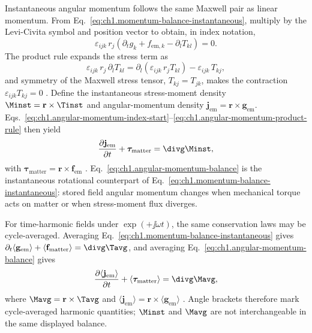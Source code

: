 Instantaneous angular momentum follows the same Maxwell pair as linear momentum. From Eq.~\eqref{eq:ch1.momentum-balance-instantaneous}, multiply by the Levi-Civita symbol and position vector to obtain, in index notation,
\begin{equation}
\label{eq:ch1.angular-momentum-index-start}
\varepsilon_{ijk}\,r_j\!\left(\partial_t g_k+f_{\mathrm{em},k}-\partial_l T_{kl}\right)
=0.
\end{equation}
The product rule expands the stress term as
\begin{equation}
\label{eq:ch1.angular-momentum-product-rule}
\varepsilon_{ijk}\,r_j\,\partial_l T_{kl}
=\partial_l\!\left(\varepsilon_{ijk}\,r_j T_{kl}\right)
-\varepsilon_{ijk}\,T_{kj},
\end{equation}
and symmetry of the Maxwell stress tensor, $T_{kj}=T_{jk}$, makes the contraction
$\varepsilon_{ijk}T_{kj}=0$ \cite{maxwell1873,stratton1941}. Define the instantaneous
stress-moment density $\Minst=\mathbf{r}\times\Tinst$ and angular-momentum density
$\mathbf{j}_{\mathrm{em}}=\mathbf{r}\times\mathbf{g}_{\mathrm{em}}$. Eqs.~\eqref{eq:ch1.angular-momentum-index-start}--\eqref{eq:ch1.angular-momentum-product-rule} then yield
\begin{equation}
\label{eq:ch1.angular-momentum-balance}
\frac{\partial\mathbf{j}_{\mathrm{em}}}{\partial t}+\boldsymbol{\tau}_{\mathrm{matter}}
=\divg\Minst,
\end{equation}
with $\boldsymbol{\tau}_{\mathrm{matter}}=\mathbf{r}\times\mathbf{f}_{\mathrm{em}}$ \cite{maxwell1873,beth1936}. Eq.~\eqref{eq:ch1.angular-momentum-balance} is the instantaneous rotational counterpart of Eq.~\eqref{eq:ch1.momentum-balance-instantaneous}: stored field angular momentum changes when mechanical torque acts on matter or when stress-moment flux diverges.

For time-harmonic fields under $\exp(+\jj\omega t)$, the same conservation laws may be cycle-averaged. Averaging Eq.~\eqref{eq:ch1.momentum-balance-instantaneous} gives $\partial_t\langle\mathbf{g}_{\mathrm{em}}\rangle+\langle\mathbf{f}_{\mathrm{matter}}\rangle=\divg\Tavg$, and averaging Eq.~\eqref{eq:ch1.angular-momentum-balance} gives
\begin{equation}
\label{eq:ch1.angular-momentum-balance-averaged}
\frac{\partial\langle\mathbf{j}_{\mathrm{em}}\rangle}{\partial t}+\langle\boldsymbol{\tau}_{\mathrm{matter}}\rangle
=\divg\Mavg,
\end{equation}
where $\Mavg=\mathbf{r}\times\Tavg$ and $\langle\mathbf{j}_{\mathrm{em}}\rangle=\mathbf{r}\times\langle\mathbf{g}_{\mathrm{em}}\rangle$ \cite{stratton1941}. Angle brackets therefore mark cycle-averaged harmonic quantities; $\Minst$ and $\Mavg$ are not interchangeable in the same displayed balance.

